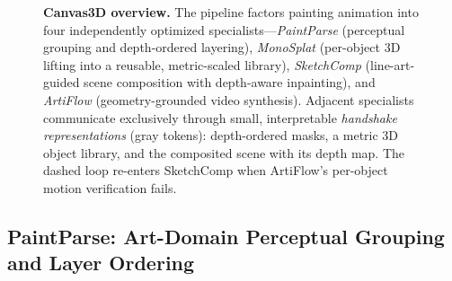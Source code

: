\begin{figure}[t]
{}
    \caption{\textbf{Canvas3D overview.} The pipeline factors painting
    animation into four independently optimized specialists---\emph{PaintParse}
    (perceptual grouping and depth-ordered layering), \emph{MonoSplat}
    (per-object 3D lifting into a reusable, metric-scaled library),
    \emph{SketchComp} (line-art-guided scene composition with depth-aware
    inpainting), and \emph{ArtiFlow} (geometry-grounded video synthesis).
    Adjacent specialists communicate exclusively through small, interpretable
    \emph{handshake representations} (gray tokens): depth-ordered masks,
    a metric 3D object library, and the composited scene with its depth map.
    The dashed loop re-enters SketchComp when ArtiFlow's per-object motion
    verification fails.}
    \label{fig:overview}
\end{figure}

\subsection{PaintParse: Art-Domain Perceptual Grouping and Layer Ordering}
\label{sec:method:paintparse}

